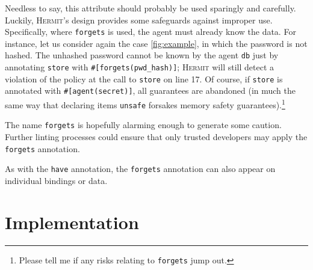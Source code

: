 \documentclass[letterpaper,twocolumn,10pt]{article}
\newcommand{\Hermit}{\textsc{Hermit}}
\begin{document}
Needless to say, this attribute should probably be used sparingly and carefully. Luckily, \Hermit's
design provides some safeguards against improper use. Specifically, where \lstinline{forgets} is
used, the agent must already know the data. For instance, let us consider again the case
\cref{fig:example}, in which the password is not hashed. The unhashed password cannot be known by
the agent \lstinline{db} just by annotating \lstinline{store} with \lstinline{#[forgets(pwd_hash)]};
\Hermit{} will still detect a violation of the policy at the call to \lstinline{store} on line 17.
Of course, if \lstinline{store} is annotated with \lstinline{#[agent(secret)]}, all guarantees are
abandoned (in much the same way that declaring items \lstinline{unsafe} forsakes memory safety
guarantees).\footnote{Please tell me if any risks relating to \lstinline{forgets} jump out.}

The name \lstinline{forgets} is hopefully alarming enough to generate some caution. Further linting
processes could ensure that only trusted developers may apply the \lstinline{forgets} annotation.

As with the \lstinline{have} annotation, the \lstinline{forgets} annotation can also appear on
individual bindings or data.





\section{Implementation}
\end{document}
